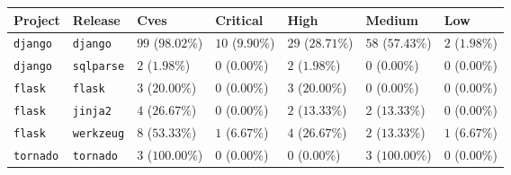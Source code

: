 \begin{tabular}{lllllll}
\toprule
Project & Release & Cves & Critical & High & Medium & Low \\
\midrule
\texttt{django} & \texttt{django} & $99$ ($98.02\%$) & $10$ ($9.90\%$) & $29$ ($28.71\%$) & $58$ ($57.43\%$) & $2$ ($1.98\%$) \\
\texttt{django} & \texttt{sqlparse} & $2$ ($1.98\%$) & $0$ ($0.00\%$) & $2$ ($1.98\%$) & $0$ ($0.00\%$) & $0$ ($0.00\%$) \\
\texttt{flask} & \texttt{flask} & $3$ ($20.00\%$) & $0$ ($0.00\%$) & $3$ ($20.00\%$) & $0$ ($0.00\%$) & $0$ ($0.00\%$) \\
\texttt{flask} & \texttt{jinja2} & $4$ ($26.67\%$) & $0$ ($0.00\%$) & $2$ ($13.33\%$) & $2$ ($13.33\%$) & $0$ ($0.00\%$) \\
\texttt{flask} & \texttt{werkzeug} & $8$ ($53.33\%$) & $1$ ($6.67\%$) & $4$ ($26.67\%$) & $2$ ($13.33\%$) & $1$ ($6.67\%$) \\
\texttt{tornado} & \texttt{tornado} & $3$ ($100.00\%$) & $0$ ($0.00\%$) & $0$ ($0.00\%$) & $3$ ($100.00\%$) & $0$ ($0.00\%$) \\
\bottomrule
\end{tabular}
